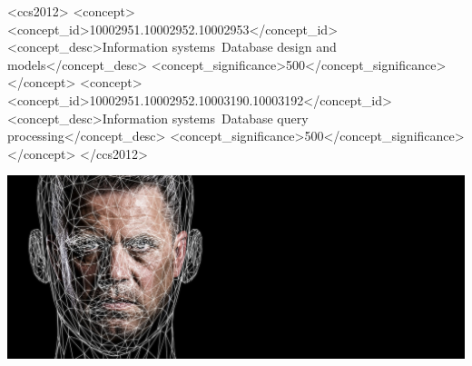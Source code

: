 \documentclass[acmsmall]{acmart}
\begin{document}
\begin{CCSXML}

\begin{CCSXML}
<ccs2012>
   <concept>
       <concept_id>10002951.10002952.10002953</concept_id>
       <concept_desc>Information systems~Database design and models</concept_desc>
       <concept_significance>500</concept_significance>
       </concept>
   <concept>
       <concept_id>10002951.10002952.10003190.10003192</concept_id>
       <concept_desc>Information systems~Database query processing</concept_desc>
       <concept_significance>500</concept_significance>
       </concept>
 </ccs2012>
\end{CCSXML}


\begin{teaserfigure}
  \includegraphics[width=\textwidth]{sampleteaser}
  \caption{}
  \Description{}
  \label{fig:teaser}
\end{teaserfigure}

\maketitle


\end{CCSXML}
\end{document}
